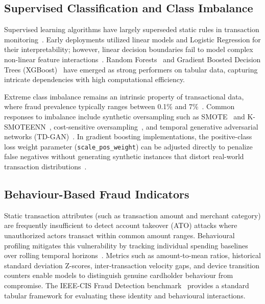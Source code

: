\documentclass[conference]{IEEEtran}
\begin{document}
\subsection{Supervised Classification and Class Imbalance}
Supervised learning algorithms have largely superseded static rules in transaction monitoring~\cite{sarna2026ai,bolton2002unsupervised}. Early deployments utilized linear models and Logistic Regression for their interpretability; however, linear decision boundaries fail to model complex non-linear feature interactions~\cite{alsagri2025hybrid}. Random Forests~\cite{breiman2001random} and Gradient Boosted Decision Trees (XGBoost)~\cite{chen2016xgboost} have emerged as strong performers on tabular data, capturing intricate dependencies with high computational efficiency.

Extreme class imbalance remains an intrinsic property of transactional data, where fraud prevalence typically ranges between 0.1\% and 7\%~\cite{jurgovsky2018sequence}. Common responses to imbalance include synthetic oversampling such as SMOTE~\cite{chawla2002smote} and K-SMOTEENN~\cite{damanik2025advanced}, cost-sensitive oversampling~\cite{ileberi2025performance}, and temporal generative adversarial networks (TD-GAN)~\cite{zheng2025integrated}. In gradient boosting implementations, the positive-class loss weight parameter (\texttt{scale\_pos\_weight}) can be adjusted directly to penalize false negatives without generating synthetic instances that distort real-world transaction distributions~\cite{chen2016xgboost,han2025enhanced}.

\subsection{Behaviour-Based Fraud Indicators}
Static transaction attributes (such as transaction amount and merchant category) are frequently insufficient to detect account takeover (ATO) attacks where unauthorized actors transact within common amount ranges. Behavioural profiling mitigates this vulnerability by tracking individual spending baselines over rolling temporal horizons~\cite{allawati2025integrated}. Metrics such as amount-to-mean ratios, historical standard deviation Z-scores, inter-transaction velocity gaps, and device transition counters enable models to distinguish genuine cardholder behaviour from compromise. The IEEE-CIS Fraud Detection benchmark~\cite{ieee2019fraud} provides a standard tabular framework for evaluating these identity and behavioural interactions.
\end{document}
